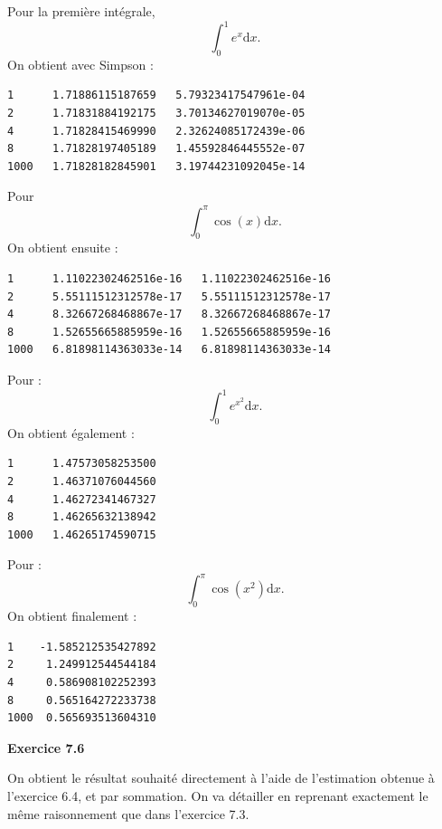 \documentclass{article}
\begin{document}
Pour la première intégrale,
    \[
    \int_0^1 e^x \mathrm{d}x.
    \]
On obtient avec Simpson :    
\begin{verbatim}
1      1.71886115187659   5.79323417547961e-04   
2      1.71831884192175   3.70134627019070e-05   
4      1.71828415469990   2.32624085172439e-06   
8      1.71828197405189   1.45592846445552e-07   
1000   1.71828182845901   3.19744231092045e-14
\end{verbatim}

Pour
    \[
    \int_0^\pi \cos(x) \mathrm{d}x.
    \]
On obtient ensuite :
\begin{verbatim}
1      1.11022302462516e-16   1.11022302462516e-16   
2      5.55111512312578e-17   5.55111512312578e-17   
4      8.32667268468867e-17   8.32667268468867e-17
8      1.52655665885959e-16   1.52655665885959e-16   
1000   6.81898114363033e-14   6.81898114363033e-14
\end{verbatim}

Pour :
    \[
    \int_0^1 e^{x^2} \mathrm{d}x.
    \]
On obtient également :
\begin{verbatim}
1      1.47573058253500   
2      1.46371076044560   
4      1.46272341467327
8      1.46265632138942   
1000   1.46265174590715
\end{verbatim}

Pour : 
    \[
    \int_0^\pi \cos(x^2) \mathrm{d}x. 
    \]
On obtient finalement :
\begin{verbatim}
1    -1.585212535427892   
2     1.249912544544184   
4     0.586908102252393
8     0.565164272233738   
1000  0.565693513604310
\end{verbatim}

{\bf Exercice 7.6}

On obtient le résultat souhaité directement à l'aide de l'estimation obtenue à l'exercice 6.4, et par sommation. On va détailler en reprenant exactement le même raisonnement que dans l'exercice 7.3.

\medskip
\end{document}
